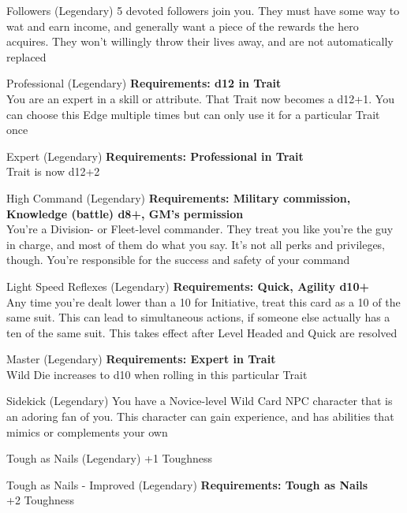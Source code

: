 \begin{multicols}{2}
\begin{genericsection}{Followers (Legendary)}
5 devoted followers join you. They must have some way to wat and earn income, and generally want a piece of the rewards the hero acquires. They won't willingly throw their lives away, and are not automatically replaced
\end{genericsection}

\begin{genericsection}{Professional (Legendary)}
\textbf{Requirements: d12 in Trait}\\
You are an expert in a skill or attribute. That Trait now becomes a d12+1. You can choose this Edge multiple times but can only use it for a particular Trait once
\end{genericsection}

\begin{genericsection}{Expert (Legendary)}
\textbf{Requirements: Professional in Trait}\\
Trait is now d12+2
\end{genericsection}

\begin{genericsection}{High Command (Legendary)}
\textbf{Requirements: Military commission, Knowledge (battle) d8+, GM's permission}\\
You’re a Division- or Fleet-level commander. They treat you like you’re the guy in charge, and most of them do what you say. It’s not all perks and privileges, though. You’re responsible for the success and safety of your command
\end{genericsection}

\begin{genericsection}{Light Speed Reflexes (Legendary)}
\textbf{Requirements: Quick, Agility d10+}\\
Any time you're dealt lower than a 10 for Initiative, treat this card as a 10 of the same suit. This can lead to simultaneous actions, if someone else actually has a ten of the same suit. This takes effect after Level Headed and Quick are resolved
\end{genericsection}

\begin{genericsection}{Master (Legendary)}
\textbf{Requirements: Expert in Trait}\\
Wild Die increases to d10 when rolling in this particular Trait
\end{genericsection}

\begin{genericsection}{Sidekick (Legendary)}
You have a Novice-level Wild Card NPC character that is an adoring fan of you. This character can gain experience, and has abilities that mimics or complements your own
\end{genericsection}

\begin{genericsection}{Tough as Nails (Legendary)}
+1 Toughness
\end{genericsection}

\begin{genericsection}{Tough as Nails - Improved (Legendary)}
\textbf{Requirements: Tough as Nails}\\
+2 Toughness
\end{genericsection}


\end{multicols}
